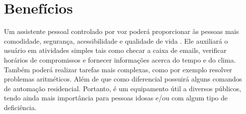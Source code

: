 \section{Benefícios}

Um assistente pessoal controlado por voz poderá proporcionar às pessoas mais comodidade, segurança, acessibilidade e qualidade de vida \cite{assistant}. Ele auxiliará o usuário em atividades simples tais como checar a caixa de emails, verificar horários de compromissos e fornecer informações acerca do tempo e do clima. Também poderá realizar tarefas mais complexas, como por exemplo resolver problemas aritméticos. Além de que como diferencial possuirá alguns comandos de automação residencial. Portanto, é um equipamento útil a diversos públicos, tendo ainda mais importância para pessoas idosas e/ou com algum tipo de deficiência.

